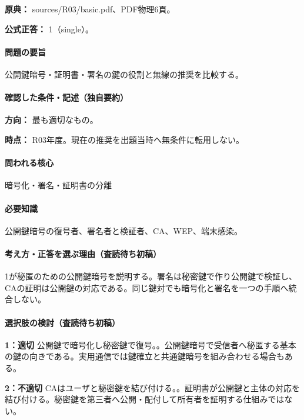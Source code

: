 \noindent\textbf{原典：} sources/R03/basic.pdf、PDF物理6頁。

\textbf{公式正答：} 1（single）。

\paragraph{問題の要旨} 公開鍵暗号・証明書・署名の鍵の役割と無線の推奨を比較する。

\paragraph{確認した条件・記述（独自要約）}\mbox{}\par

\noindent\textbf{方向：} 最も適切なもの。\par

\noindent\textbf{時点：} R03年度。現在の推奨を出題当時へ無条件に転用しない。\par

\paragraph{問われる核心} 暗号化・署名・証明書の分離

\paragraph{必要知識} 公開鍵暗号の復号者、署名者と検証者、CA、WEP、端末感染。

\paragraph{考え方・正答を選ぶ理由（査読待ち初稿）} 1が秘匿のための公開鍵暗号を説明する。署名は秘密鍵で作り公開鍵で検証し、CAの証明は公開鍵の対応である。同じ鍵対でも暗号化と署名を一つの手順へ統合しない。

\paragraph{選択肢の検討（査読待ち初稿）}\mbox{}\par

\noindent\textbf{1：適切} 公開鍵で暗号化し秘密鍵で復号。。公開鍵暗号で受信者へ秘匿する基本の鍵の向きである。実用通信では鍵確立と共通鍵暗号を組み合わせる場合もある。\par

\noindent\textbf{2：不適切} CAはユーザと秘密鍵を結び付ける。。証明書が公開鍵と主体の対応を結び付ける。秘密鍵を第三者へ公開・配付して所有者を証明する仕組みではない。\par

